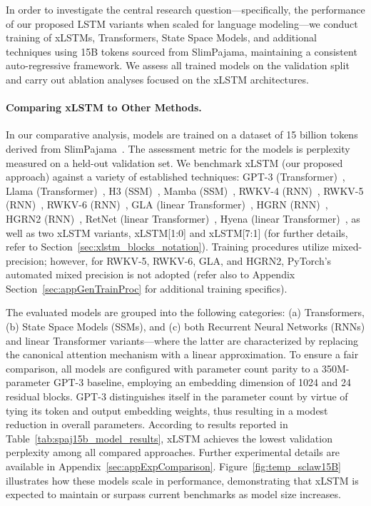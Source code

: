 In order to investigate the central research question—specifically, the performance of our proposed LSTM variants when scaled for language modeling—we conduct training of xLSTMs, Transformers, State Space Models, and additional techniques using 15B tokens sourced from SlimPajama, maintaining a consistent auto-regressive framework. We assess all trained models on the validation split and carry out ablation analyses focused on the xLSTM architectures.

\paragraph{Comparing xLSTM to Other Methods.} In our comparative analysis, models are trained on a dataset of 15 billion tokens derived from SlimPajama~\citep{Soboleva:23}. The assessment metric for the models is perplexity measured on a held-out validation set. We benchmark xLSTM (our proposed approach) against a variety of established techniques: GPT-3 (Transformer)~\citep{Brown:20short}, Llama (Transformer)~\citep{Touvron:23arxiv}, H3 (SSM)~\citep{Fu:23}, Mamba (SSM)~\citep{Gu:24arxiv}, RWKV-4 (RNN)~\citep{Peng:23arxivshort}, RWKV-5 (RNN)~\citep{Peng:24arxivshort}, RWKV-6 (RNN)~\citep{Peng:24arxivshort}, GLA (linear Transformer)~\citep{Yang:23arxiv}, HGRN (RNN)~\citep{Qin:23}, HGRN2 (RNN)~\citep{Qin:24arxiv}, RetNet (linear Transformer)~\citep{Sun:23arxiv}, Hyena (linear Transformer)~\citep{Poli:23}, as well as two xLSTM variants, xLSTM[1:0] and xLSTM[7:1] (for further details, refer to Section~\ref{sec:xlstm_blocks_notation}). Training procedures utilize mixed-precision; however, for RWKV-5, RWKV-6, GLA, and HGRN2, PyTorch's automated mixed precision is not adopted (refer also to Appendix Section~\ref{sec:appGenTrainProc} for additional training specifics).

The evaluated models are grouped into the following categories: (a) Transformers, (b) State Space Models (SSMs), and (c) both Recurrent Neural Networks (RNNs) and linear Transformer variants—where the latter are characterized by replacing the canonical attention mechanism with a linear approximation. To ensure a fair comparison, all models are configured with parameter count parity to a 350M-parameter GPT-3 baseline, employing an embedding dimension of 1024 and 24 residual blocks. GPT-3 distinguishes itself in the parameter count by virtue of tying its token and output embedding weights, thus resulting in a modest reduction in overall parameters. According to results reported in Table~\ref{tab:spaj15b_model_results}, xLSTM achieves the lowest validation perplexity among all compared approaches. Further experimental details are available in Appendix~\ref{sec:appExpComparison}. Figure~\ref{fig:temp_sclaw15B} illustrates how these models scale in performance, demonstrating that xLSTM is expected to maintain or surpass current benchmarks as model size increases.


